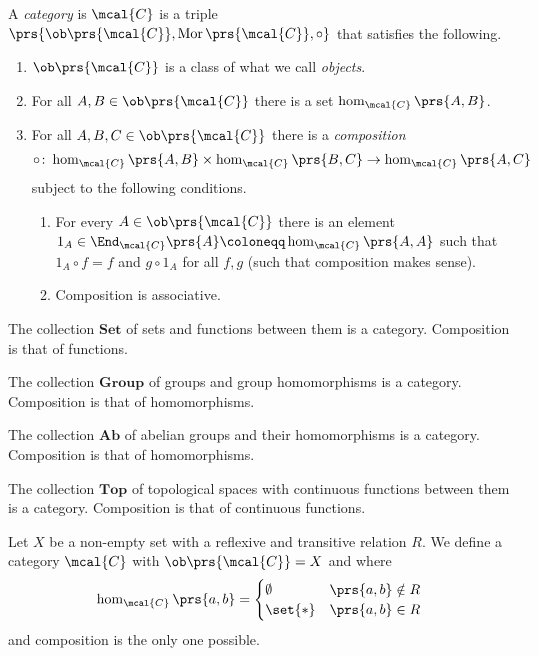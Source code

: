 \documentclass[11pt]{kbook}
\DeclareMathOperator{\Mor}{Mor}
\begin{document}
\begin{definition}[Category]
A \emph{category} is $\mcal{C}$ is a triple $\prs{\ob\prs{\mcal{C}}, \Mor\prs{\mcal{C}}, \circ}$ that satisfies the following.

\begin{enumerate}[label = (\roman*)]
\item $\ob\prs{\mcal{C}}$ is a class of what we call \emph{objects}.
\item For all $A,B \in \ob\prs{\mcal{C}}$ there is a set $\hom_{\mcal{C}}\prs{A,B}$.
\item For all $A,B,C \in \ob\prs{\mcal{C}}$ there is a \emph{composition}
\[\circ \colon \hom_{\mcal{C}}\prs{A,B} \times \hom_{\mcal{C}}\prs{B,C} \to \hom_{\mcal{C}}\prs{A,C}\]
subject to the following conditions.
\begin{enumerate}[label = (\Roman*)]
\item For every $A \in \ob\prs{\mcal{C}}$ there is an element $1_A \in \End_{\mcal{C}}\prs{A} \coloneqq \hom_{\mcal{C}}\prs{A,A}$ such that $1_A \circ f = f$ and $g \circ 1_A$ for all $f,g$ (such that composition makes sense).
\item Composition is associative.
\end{enumerate}
\end{enumerate}
\end{definition}

\begin{example}
The collection $\mathbf{Set}$ of sets and functions between them is a category. Composition is that of functions.
\end{example}

\begin{example}
The collection $\mathbf{Group}$ of groups and group homomorphisms is a category. Composition is that of homomorphisms.
\end{example}

\begin{example}[$\mathbf{Ab}$]
The collection $\mathbf{Ab}$ of abelian groups and their homomorphisms is a category. Composition is that of homomorphisms.
\end{example}

\begin{example}
The collection $\mathbf{Top}$ of topological spaces with continuous functions between them is a category. Composition is that of continuous functions.
\end{example}

\begin{example}
Let $X$ be a non-empty set with a reflexive and transitive relation $R$. We define a category $\mcal{C}$ with $\ob\prs{\mcal{C}} = X$ and where
\[\hom_{\mcal{C}}\prs{a,b} = \begin{cases}\emptyset & \prs{a,b} \notin R \\ \set{*} & \prs{a,b} \in R\end{cases}\]
and composition is the only one possible.
\end{example}


\printbibliography
\end{document}
